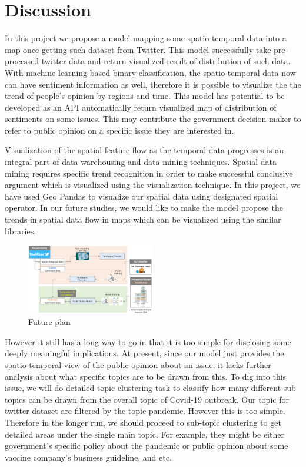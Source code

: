 \section{Discussion}
In this project we propose a model mapping some spatio-temporal data into a
map once getting such dataset from Twitter. This model successfully take
pre-processed twitter data and return visualized result of distribution of
such data. With machine learning-based binary classification, the
spatio-temporal data now can have sentiment information as well, therefore it
is possible to visualize the the trend of people's opinion by regions and
time. This model has potential to be developed as an API automatically return
visualized map of distribution of sentiments on some issues. This may
contribute the government decision maker to refer to public opinion on a
specific issue they are interested in. 

Visualization of the spatial feature flow as the temporal data progresses is
an integral part of data warehousing and data mining techniques. Spatial data
mining requires specific trend recognition in order to make successful
conclusive argument which is visualized using the visualization technique. In
this project, we have used Geo Pandas to visualize our spatial data using
designated spatial operator. In our future studies, we would like to make the
model propose the trends in spatial data flow in maps which can be visualized
using the similar libraries.
\begin{figure}[H]
\centering
\includegraphics[width=0.5\textwidth]{imgs/Research_Process.png}
\caption{\label{fig:Future plan}Future plan}
\end{figure}
However it still has a long way to go in that it is too simple for disclosing
some deeply meaningful implications. At present, since our model just
provides the spatio-temporal view of the public opinion about an issue, it
lacks further analysis about what specific topics are to be drawn from this.
To dig into this issue, we will do detailed topic clustering task to classify
how many different sub topics can be drawn from the overall topic of Covid-19
outbreak. Our topic for twitter dataset are filtered by the topic pandemic.
However this is too simple. Therefore in the longer run, we should proceed to
sub-topic clustering to get detailed areas under the single main topic. For
example, they might be either government's specific policy about the pandemic
or public opinion about some vaccine company's business guideline, and etc.

